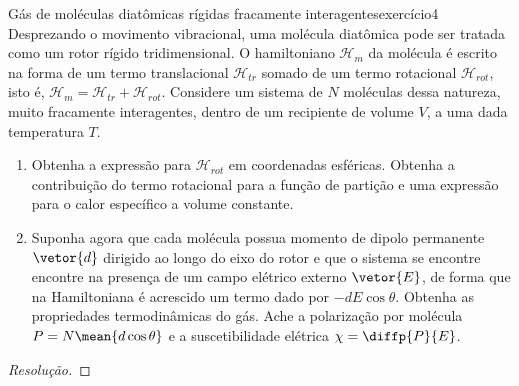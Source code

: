 \begin{exercício}{Gás de moléculas diatômicas rígidas fracamente interagentes}{exercício4}
    Desprezando o movimento vibracional, uma molécula diatômica pode ser tratada como um rotor rígido tridimensional. O hamiltoniano \(\mathcal{H}_m\) da molécula é escrito na forma de um termo translacional \(\mathcal{H}_{tr}\) somado de um termo rotacional \(\mathcal{H}_{rot}\), isto é, \(\mathcal{H}_m=\mathcal{H}_{tr} + \mathcal{H}_{rot}\). Considere um sistema de \(N\) moléculas dessa natureza, muito fracamente interagentes, dentro de um recipiente de volume \(V\), a uma dada temperatura \(T\).
    \begin{enumerate}[label=(\alph*)]
        \item Obtenha a expressão para \(\mathcal{H}_{rot}\) em coordenadas esféricas. Obtenha a contribuição do termo rotacional para a função de partição e uma expressão para o calor específico a volume constante.
        \item Suponha agora que cada molécula possua momento de dipolo permanente \(\vetor{d}\) dirigido ao longo do eixo do rotor e que o sistema se encontre encontre na presença de um campo elétrico externo \(\vetor{E}\), de forma que na Hamiltoniana é acrescido um termo dado por \(-d E \cos\theta\). Obtenha as propriedades termodinâmicas do gás. Ache a polarização por molécula \(P = N\mean{d \cos\theta}\) e a suscetibilidade elétrica \(\chi = \diffp{P}{E}\).
    \end{enumerate}
\end{exercício}
\begin{proof}[Resolução]

\end{proof}
